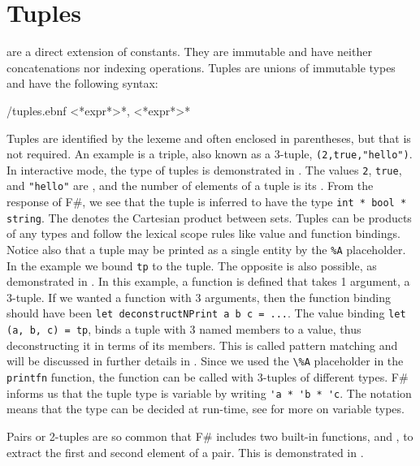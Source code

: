 \documentclass[fsharpnotes.tex]{subfiles}
\begin{document}
\section{Tuples}
 are a direct extension of constants. They are immutable and have neither concatenations nor indexing operations. Tuples are unions of immutable types and have the following syntax:
%
\begin{verbatimwrite}{\ebnf/tuples.ebnf}
<*expr*>{*, <*expr*>*}
\end{verbatimwrite}
%
Tuples are identified by the \lexeme{,} lexeme and often enclosed in parentheses, but that is not required. An example is a triple, also known as a 3-tuple, \lstinline!(2,true,"hello")!. In interactive mode, the type of tuples is demonstrated in .
%
%
The values \lstinline!2!, \lstinline!true!, and \lstinline!"hello"! are , and the number of elements of a tuple is its . From the response of F\#, we see that the tuple is inferred to have the type \lstinline!int * bool * string!. The \lexeme{*} denotes the Cartesian product between sets.  Tuples can be products of any types and follow the lexical scope rules like value and function bindings. Notice also that a tuple may be printed as a single entity by the \lstinline!%A! %
placeholder. In the example we bound \lstinline!tp! to the tuple. The opposite is also possible, as demonstrated in .
%
%
In this example, a function is defined that takes 1 argument, a 3-tuple. If we wanted a function with 3 arguments, then the function binding should have been \lstinline{let deconstructNPrint a b c = ...}. The value binding \lstinline{let (a, b, c) = tp}, binds a tuple with 3 named members to a value, thus deconstructing it in terms of its members. This is called pattern matching and will be discussed in further details in . Since we used the \lstinline!\%A! placeholder in the \lstinline!printfn! function, the function can be called with 3-tuples of different types. F\# informs us that the tuple type is variable by writing \lstinline{'a * 'b * 'c}. The  notation means that the type can be decided at run-time, see  for more on variable types. 

Pairs or 2-tuples are so common that F\# includes two built-in functions, and , to extract the first and second element of a pair. This is demonstrated in .
%
%
\end{document}
